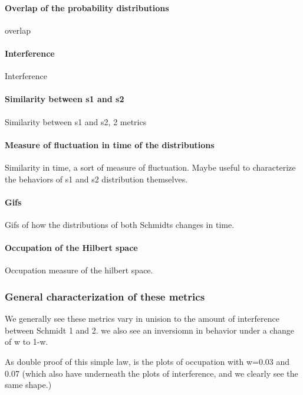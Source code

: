 \documentclass{article}
\begin{document}
\paragraph{Overlap of the probability distributions}
overlap

\paragraph{Interference}
Interference

\paragraph{Similarity between s1 and s2}
Similarity between s1 and s2, 2 metrics

\paragraph{Measure of fluctuation in time of the distributions}
Similarity in time, a sort of measure of fluctuation. Maybe useful to characterize the behaviors of s1 and s2 distribution themselves.

\paragraph{Gifs}
Gifs of how the distributions of both Schmidts changes in time.

\paragraph{Occupation of the Hilbert space}
Occupation measure of the hilbert space. 


\subsubsection{General characterization of these metrics}

We generally see these metrics vary in unision to the amount of interference between Schmidt 1 and 2.
we also see an inversiomn in behavior under a change of w to 1-w. 

As double proof of this simple law, is the plots of occupation with w=0.03 and 0.07 (which also have underneath the plots of interference, and we clearly see the same shape.)
\end{document}
